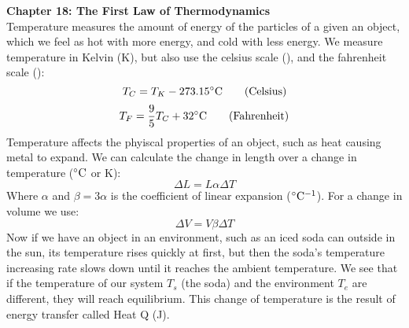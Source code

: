 \documentclass[11pt]{article}
\newcommand{\fahrenheit}{\degree \text{F}}
\begin{document}
    \noindent \textbf{Chapter 18: The First Law of Thermodynamics}
    \\ \noindent \newline Temperature measures the amount of energy of the particles of a given an object,
    which we feel as hot with more energy, and cold with less energy.
    We measure temperature in Kelvin (K),
    but also use the celsius scale (\celsius), and the fahrenheit scale (\fahrenheit):
    \begin{equation}
       T_C = T_K - 273.15\celsius \tag{Celsius}
    \end{equation}
    \begin{equation}
        T_F = \frac{9}{5}T_C + 32\celsius \tag{Fahrenheit}
    \end{equation}
    \noindent Temperature affects the phyiscal properties of an object, such as heat causing metal to expand.
    We can calculate the change in length over a change in temperature ($\celsius$ or K):
    \begin{equation}
        \Delta L = L \alpha \Delta T
    \end{equation}
    \noindent Where $\alpha$ and $ \beta = 3\alpha$ is the coefficient of linear expansion ($\celsius^{-1}$).
    For a change in volume we use:
    \begin{equation}
        \Delta V = V \beta \Delta T
    \end{equation}
    \noindent Now if we have an object in an environment, such as an iced soda can outside in the sun,
    its temperature rises quickly at first, but then the soda's temperature increasing rate slows down
    until it reaches the ambient temperature.
    We see that if the temperature of our system $T_s$ (the soda) and the environment $T_e$ are different, they
    will reach equilibrium.
    This change of temperature is the result of energy transfer called Heat Q (J).
\end{document}
